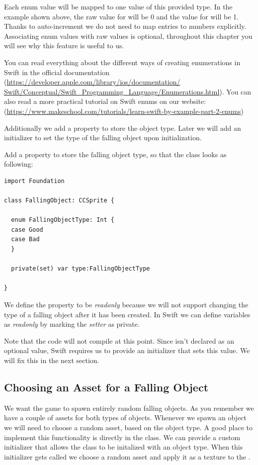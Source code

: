 Each enum value will be mapped to one value of this
provided type. In the example shown above, the raw value for
 will be 0 and the value for
 will be 1. Thanks to auto-increment we do not
need to map entries to numbers explicitly. Associating enum values with raw values is optional,
throughout this chapter you will see why this feature is useful to us.

\begin{details} 
You can read everything about the different ways of creating enumerations in
Swift in the official documentation
(\url{https://developer.apple.com/library/ios/documentation/
Swift/Conceptual/Swift_Programming_Language/Enumerations.html}).
You can also read a more practical tutorial on Swift enums on our website:
(\url{https://www.makeschool.com/tutorials/learn-swift-by-example-part-2-enums})
\end{details}

Additionally we add a property to store the object type. Later we will
add an initializer to set the type of the falling object upon initialization. 

\begin{leftbar}
Add a property to store the falling object type, so that the class looks as
following:
\begin{lstlisting}
import Foundation

class FallingObject: CCSprite {

  enum FallingObjectType: Int {
  case Good
  case Bad
  }
    
  private(set) var type:FallingObjectType
  
}
\end{lstlisting}
\end{leftbar}

We define the property to be \textit{readonly} because we will not
support changing the type of a falling object after it has been created. In Swift we can 
define variables as \textit{readonly} by marking the \textit{setter} as private.

Note that the code will not compile at this point. Since  isn't
declared as an optional value, Swift requires us to provide an initializer that
sets this value. We will fix this in the next section.

\subsection{Choosing an Asset for a Falling Object}
We want the game to spawn entirely random falling objects. As you remember we
have a couple of assets for both types of objects. Whenever we spawn an object
we will need to choose a random asset, based on the object type. A good place to
implement this functionality is directly in the 
class. We can provide a custom initializer that allows the class to be initalized with an object type.
When this initializer gets called we choose a random asset and apply it as a
texture to the .

